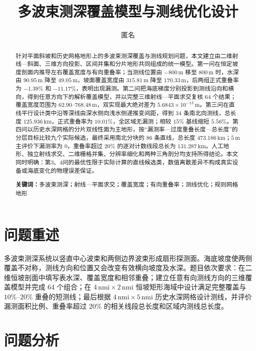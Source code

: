 \documentclass[UTF8,a4paper,12pt]{ctexart}
\title{\heiti 多波束测深覆盖模型与测线优化设计}
\author{匿名}
\date{}
\newcommand{\nmi}{\,\mathrm{nmi}}
\newcommand{\m}{\,\mathrm{m}}
\newcommand{\km}{\,\mathrm{km}}
\begin{document}
\maketitle

\begin{abstract}
针对平面斜坡和历史网格地形上的多波束测深覆盖与测线规划问题，本文建立由二维射线—斜面、三维方向投影、区间并集和分片地形共同组成的统一模型。第一问在恒定坡度剖面内推导左右覆盖宽度与有向重叠率；当测线位置由 $-800\m$ 移至 $800\m$ 时，水深由 $90.95\m$ 降至 $49.05\m$，坡面覆盖宽度由 $315.81\m$ 降至 $170.33\m$，后两组正式重叠率为 $-1.39\%$ 和 $-11.17\%$，表明出现漏测。第二问把海底梯度分别投影到测线沿向和横向，得到任意方向下的解析覆盖模型，并以完整三维射线—平面求交复核 64 个结果；覆盖宽度范围为 $62.90$--$768.48\m$，双实现最大绝对差为 $5.6843\times10^{-13}\m$。第三问在直线平行设计类中沿等深线由深水侧向浅水侧递推变间距，得到 34 条南北向测线，总长度 $125.936\km$，正式重叠率为 $10.01\%$，全区域无漏测；相较 $15\%$ 基线缩短 $5.56\%$。第四问以历史水深网格的分片双线性面为主地形，按“漏测率—过度重叠长度—总长度”的分层目标比较九个实际候选，最终采用南北分块的 86 条直线，总长度 $473.186\km$；$5\m$ 主评价下漏测率为 0，重叠率超过 $20\%$ 的逐对计数线段总长为 $131.287\km$。人工地形、独立射线求交、二维栅格并集、分辨率细化和两种三角剖分均支持所得结论。本文同时明确：第3、4问的最优性限于实际计算的直线候选类，数值离散差异不构成真实设备或海底变化的物理误差保证。

\textbf{关键词：}多波束测深；射线—平面求交；覆盖宽度；有向重叠率；测线优化；规则网格地形
\end{abstract}

\tableofcontents
\newpage

\section{问题重述}

多波束测深系统以竖直中心波束和两侧边界波束形成扇形探测面。海底坡度使两侧覆盖不对称，测线方向和位置又会改变有效横向坡度及水深。题目依次要求：在二维恒坡剖面中填写表水深、覆盖宽度和相邻重叠；建立任意有向测线方向的三维覆盖模型并完成 64 个组合；在 $4\nmi\times2\nmi$ 恒坡矩形海域中设计满足完整覆盖与 $10\%$--$20\%$ 重叠的短测线；最后根据 $4\nmi\times5\nmi$ 历史水深网格设计测线，并评价漏测面积比例、重叠率超过 $20\%$ 的相关线段总长度和区域内测线总长度。

\section{问题分析}
\end{document}
